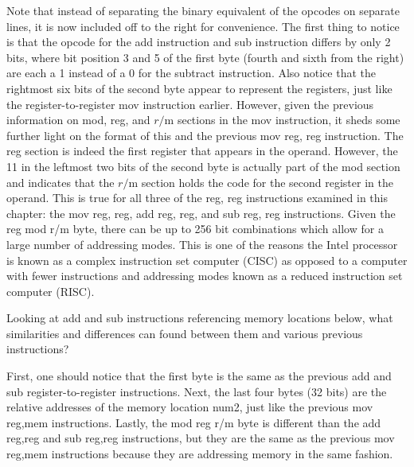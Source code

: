 \documentclass[10pt]{book}
\begin{document}
Note that instead of separating the binary equivalent of the opcodes on separate lines, it is now included off to the right for convenience. The first thing to notice is that the opcode for the add instruction and sub instruction differs by only 2 bits, where bit position 3 and 5 of the first byte (fourth and sixth from the right) are each a 1 instead of a 0 for the subtract instruction. Also notice that the rightmost six bits of the second byte appear to represent the registers, just like the register-to-register mov instruction earlier. However, given the previous information on mod, reg, and $r / \mathrm{m}$ sections in the mov instruction, it sheds some further light on the format of this and the previous mov reg, reg instruction. The reg section is indeed the first register that appears in the operand. However, the 11 in the leftmost two bits of the second byte is actually part of the mod section and indicates that the $r / \mathrm{m}$ section holds the code for the second register in the operand. This is true for all three of the reg, reg instructions examined in this chapter: the mov reg, reg, add reg, reg, and sub reg, reg instructions.
Given the reg mod r/m byte, there can be up to 256 bit combinations which allow for a large number of addressing modes. This is one of the reasons the Intel processor is known as a complex instruction set computer (CISC) as opposed to a computer with fewer instructions and addressing modes known as a reduced instruction set computer (RISC).

Looking at add and sub instructions referencing memory locations below, what similarities and differences can found between them and various previous instructions?

First, one should notice that the first byte is the same as the previous add and sub register-to-register instructions. Next, the last four bytes (32 bits) are the relative addresses of the memory location num2, just like the previous mov reg,mem instructions. Lastly, the mod reg r/m byte is different than the add reg,reg and sub reg,reg instructions, but they are the same as the previous mov reg,mem instructions because they are addressing memory in the same fashion.
\end{document}
